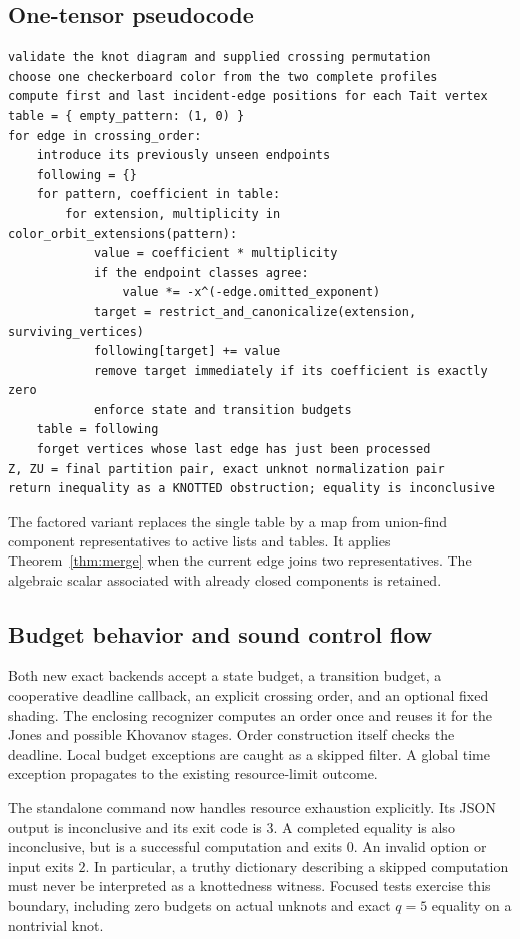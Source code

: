 \subsection{One-tensor pseudocode}

\begin{lstlisting}[caption={Exact equality-pattern transfer at a fixed color count, for $n>0$.}]
validate the knot diagram and supplied crossing permutation
choose one checkerboard color from the two complete profiles
compute first and last incident-edge positions for each Tait vertex
table = { empty_pattern: (1, 0) }
for edge in crossing_order:
    introduce its previously unseen endpoints
    following = {}
    for pattern, coefficient in table:
        for extension, multiplicity in color_orbit_extensions(pattern):
            value = coefficient * multiplicity
            if the endpoint classes agree:
                value *= -x^(-edge.omitted_exponent)
            target = restrict_and_canonicalize(extension, surviving_vertices)
            following[target] += value
            remove target immediately if its coefficient is exactly zero
            enforce state and transition budgets
    table = following
    forget vertices whose last edge has just been processed
Z, ZU = final partition pair, exact unknot normalization pair
return inequality as a KNOTTED obstruction; equality is inconclusive
\end{lstlisting}

The factored variant replaces the single table by a map from union-find
component representatives to active lists and tables. It applies
Theorem~\ref{thm:merge} when the current edge joins two representatives.
The algebraic scalar associated with already closed components is retained.

\subsection{Budget behavior and sound control flow}

Both new exact backends accept a state budget, a transition budget, a
cooperative deadline callback, an explicit crossing order, and an optional
fixed shading. The enclosing recognizer computes an order once and reuses
it for the Jones and possible Khovanov stages.
Order construction itself checks the deadline.
Local budget exceptions are caught as a skipped filter. A global time
exception propagates to the existing resource-limit outcome.

The standalone  command now handles resource exhaustion
explicitly. Its JSON output is inconclusive and its exit code is $3$.
A completed equality is also inconclusive, but is a successful computation
and exits $0$. An invalid option or input exits $2$.
In particular, a truthy dictionary describing a skipped computation must
never be interpreted as a knottedness witness. Focused tests exercise this
boundary, including zero budgets on actual unknots and exact $q=5$ equality
on a nontrivial knot.

